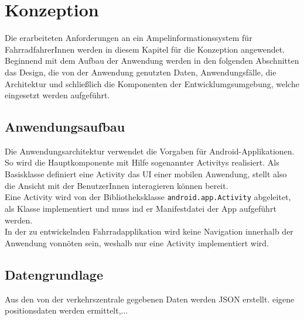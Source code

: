 \chapter{\label{chap:entwurf}Konzeption}
Die erarbeiteten Anforderungen an ein Ampelinformationssystem für FahrradfahrerInnen werden in diesem Kapitel für die Konzeption angewendet. Beginnend mit dem Aufbau der Anwendung werden in den folgenden Abschnitten das Design, die von der Anwendung genutzten Daten, Anwendungsfälle, die Architektur und schließlich die Komponenten der Entwicklumgsumgebung, welche eingesetzt werden aufgeführt. 
\section{Anwendungsaufbau}
Die Anwendungsarchitektur verwendet die Vorgaben für Android-Applikationen. So wird die Hauptkomponente mit Hilfe sogenannter \glspl{Activity} realisiert. Als Basisklasse definiert eine \gls{Activity} das \gls{UI} einer mobilen Anwendung, stellt also die Ansicht mit der BenutzerInnen interagieren können bereit.\\
Eine \gls{Activity} wird von der Bibliotheksklasse \texttt{android.app.Activity} abgeleitet, als Klasse implementiert und muss ind er Manifestdatei der \gls{App} aufgeführt werden. \cite{android_activity} \\
In der zu entwickelnden Fahrradapplikation wird keine Navigation innerhalb der Anwendung vonnöten sein, weshalb nur eine \gls{Activity} implementiert wird.
\section{Datengrundlage}
Aus den von der verkehrszentrale gegebenen Daten werden JSON erstellt. eigene positionsdaten werden ermittelt,... 

